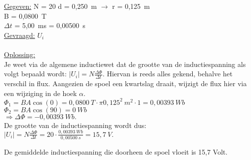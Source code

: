 \documentclass[a4paper,12pt,twoside]{article}%
\begin{document}
\underline{Gegeven:}\newline
N = 20\newline
d = 0,250~m $\rightarrow$ r = 0,125~m\\
B = 0,0800~T\\
$\Delta t$ = 5,00~ms = 0,00500~s\\

\underline{Gevraagd:}
$U_i$ \\\\
\underline{Oplossing:}\\
Je weet via de algemene inductiewet dat de grootte van de inductiespanning als volgt bepaald wordt:
\(\left|U_i\right|=N\frac{\Delta\Phi}{\Delta t}.\)
Hiervan is reeds alles gekend, behalve het verschil in flux. Aangezien de spoel een kwartslag draait, wijzigt de flux hier via een wijziging in de hoek $\alpha$.\newline
$\Phi_1 = BA\cos(0)=0,0800~T\cdot\pi 0,125^2~m^2\cdot 1= 0,00393~Wb$\newline
$\Phi_2 = BA\cos(90) = 0~Wb$\\
$\Rightarrow \Delta\Phi = -0,00393~Wb.$\\
De grootte van de inductiespanning wordt dus:
\(\left|U_i\right|=N\frac{\Delta\Phi}{\Delta t}=20\cdot\frac{0,00393~Wb}{0,00500~s}=15,7~V.\)

De gemiddelde inductiespanning die doorheen de spoel vloeit is 15,7 Volt. 


\newpage
\end{document}
